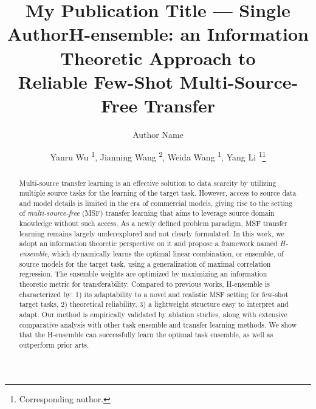 \documentclass[letterpaper]{article} %
\title{My Publication Title --- Single Author}
\author {
    Author Name
}
\title{H-ensemble: an Information Theoretic Approach to \\Reliable Few-Shot Multi-Source-Free Transfer}
\author {
    Yanru Wu \textsuperscript{\rm 1}, %
    Jianning Wang \textsuperscript{\rm 2},
    Weida Wang \textsuperscript{\rm 1},
    Yang Li \textsuperscript{\rm 1}\footnote{Corresponding author.} %
}
\begin{document}
\maketitle

\begin{abstract}
Multi-source transfer learning is an effective solution to data scarcity by utilizing multiple source tasks for the learning of the target task. However, access to source data and model details is limited in the era of commercial models, giving rise to the setting of \textit{multi-source-free} (MSF) transfer learning that aims to leverage source domain knowledge without such access. As a newly defined problem paradigm, MSF transfer learning remains largely underexplored and not clearly formulated. In this work, we adopt an information theoretic perspective on it and propose a framework named \textit{H-ensemble}, which dynamically learns the optimal linear combination, or ensemble, of source models for the target task, using a generalization of maximal correlation regression. The ensemble weights are optimized by maximizing an information theoretic metric for transferability. Compared to previous works, H-ensemble is characterized by: 1) its adaptability to a novel and realistic MSF setting for few-shot target tasks, 2) theoretical reliability, 3) a lightweight structure easy to interpret and adapt. Our method is empirically validated by ablation studies, along with extensive comparative analysis with other task ensemble and transfer learning methods. We show that the H-ensemble can successfully learn the optimal task ensemble, as well as outperform prior arts. 

\end{abstract}
\end{document}
